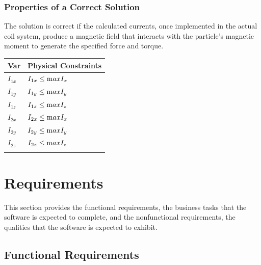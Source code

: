 \documentclass[12pt]{article}
\begin{document}
\subsubsection{Properties of a Correct Solution} \label{sec_CorrectSolution}

\noindent
 The solution is correct if the calculated currents, once implemented in the actual coil system, produce a magnetic field that interacts with the particle's magnetic moment to generate the specified force and torque.

\begin{table}[!h]
\caption{Output Variables} \label{TblOutputVar}
\renewcommand{\arraystretch}{1.2}
\noindent \begin{longtable*}{l l} 
  \toprule
  \textbf{Var} & \textbf{Physical Constraints} \\
  \midrule 
   $I_{1x}$ & $I_{1x} \leq \text maxI_{x}$\\
   $I_{1y}$ & $I_{1y} \leq \text maxI_{y}$\\
   $I_{1z}$ & $I_{1z} \leq \text maxI_{z}$\\
   $I_{2x}$ & $I_{2x} \leq \text maxI_{x}$\\
   $I_{2y}$ & $I_{2y} \leq \text maxI_{y}$\\
   $I_{2z}$ & $I_{2z} \leq \text maxI_{z}$\\
  \\
  \bottomrule
\end{longtable*}
\end{table}


\section{Requirements}

This section provides the functional requirements, the business tasks that the
software is expected to complete, and the nonfunctional requirements, the
qualities that the software is expected to exhibit.

\subsection{Functional Requirements}
\end{document}
